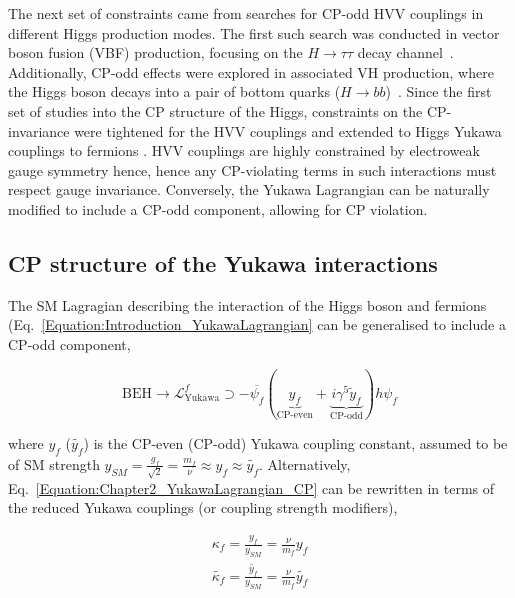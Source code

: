 The next set of constraints came from searches for CP-odd 
HVV couplings in different Higgs production modes. The first such search was conducted in vector boson fusion (VBF) production, focusing on the 
$H\to\tau\tau$ decay channel~\cite{CP_constraints_4}. Additionally, CP-odd effects were explored in associated VH production, where the Higgs boson decays into a pair of bottom quarks ($H\to bb$)~\cite{CP_constraints_5}. Since the first set of studies into the CP structure of the Higgs, constraints on the CP-invariance were tightened for the HVV couplings and extended to Higgs Yukawa couplings to fermions \cite{CP_constraints_6,CP_constraints_7,CP_constraints_8,CP_constraints_9,CP_constraints_10,CP_constraints_11,CP_constraints_12,CP_constraints_13,CP_constraints_14,CP_constraints_15,CP_constraints_16,CP_constraints_17,CP_constraints_18,CP_constraints_19,CP_constraints_20,CP_constraints_21,CP_constraints_22}. HVV couplings are highly constrained by electroweak gauge symmetry hence, hence any CP-violating terms in such interactions must respect gauge invariance. Conversely, the Yukawa Lagrangian can be naturally modified to include a CP-odd component, allowing for CP violation.

\subsection{CP structure of the Yukawa interactions}

The SM Lagragian describing the interaction of the Higgs boson and fermions (Eq.~\ref{Equation:Introduction_YukawaLagrangian} can be generalised to include a CP-odd component,

\begin{equation}
    \text{BEH} \rightarrow \mathcal{L}_{\text{Yukawa}}^f \supset - \overline{\psi_f} (\underbrace{y_f}_{\text{CP-even}} + \underbrace{i\gamma^5\tilde{y}_f}_{\text{CP-odd}})h\psi_f
\label{Equation:Chapter2_YukawaLagrangian_CP}
\end{equation}

where $y_f$ ($\tilde{y_f}$) is the CP-even (CP-odd) Yukawa coupling constant, assumed to be of SM strength \ie $y_{SM} = \frac{g_f}{\sqrt{2}}=\frac{m_f}{\nu}\approx y_f \approx \tilde{y_f}$. Alternatively, Eq.~\ref{Equation:Chapter2_YukawaLagrangian_CP} can be rewritten in terms of the reduced Yukawa couplings (or coupling strength modifiers),

\begin{equation}
\begin{aligned}
    \kappa_f = \frac{y_f}{y_{SM}}=\frac{\nu}{m_f}y_f \\
    \tilde{\kappa_f} = \frac{\tilde{y_f}}{y_{SM}}=\frac{\nu}{m_f}\tilde{y_f} \\
\end{aligned}
\end{equation}

